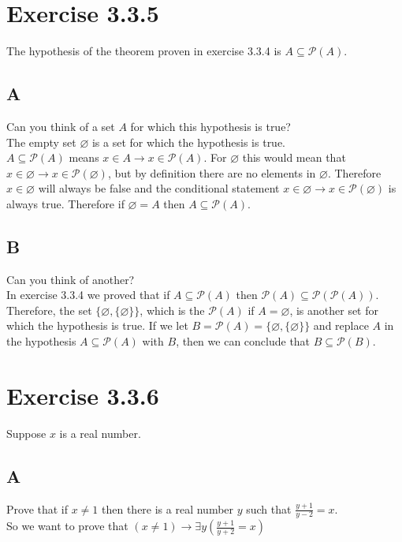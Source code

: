 \documentclass{article}
\newcommand{\n}{ \noindent }
\newcommand{\pwset}{\mathscr{P}}
\begin{document}
\section*{Exercise 3.3.5}
\n The hypothesis of the theorem proven in exercise 3.3.4 is $A \subseteq \pwset(A)$.
\subsection*{A}
\n Can you think of a set $A$ for which this hypothesis is true? \\

\n The empty set $\varnothing$ is a set for which the hypothesis is true. \\

\n $A \subseteq \pwset(A)$ means $x \in A \rightarrow x \in \pwset(A)$. For $\varnothing$ this would mean that $x \in \varnothing \rightarrow x \in \pwset(\varnothing)$, but by definition there are no elements in $\varnothing$. Therefore $x \in \varnothing$ will always be false and the conditional statement $x \in \varnothing \rightarrow x \in \pwset(\varnothing)$ is always true. Therefore if $\varnothing = A$ then $A \subseteq \pwset(A)$. 

\subsection*{B}
\n Can you think of another? \\

\n In exercise 3.3.4 we proved that if $A \subseteq \pwset(A)$ then $\pwset(A) \subseteq \pwset(\pwset(A))$. Therefore, the set $\{\varnothing, \{\varnothing\}\}$, which is the $\pwset(A)$ if $A = \varnothing$, is another set for which the hypothesis is true. If we let $B = \pwset(A) = \{\varnothing, \{\varnothing\}\}$ and replace $A$ in the hypothesis $A \subseteq \pwset(A)$ with $B$, then we can conclude that $B \subseteq \pwset(B)$.

\section*{Exercise 3.3.6}
Suppose $x$ is a real number.
\subsection*{A}
Prove that if $x \neq 1$ then there is a real number $y$ such that $\tfrac{y+1}{y-2} = x$. \\

So we want to prove that $(x \neq 1) \rightarrow \exists y \left( \tfrac{y+1}{y+2} = x \right)$ \\
\end{document}
